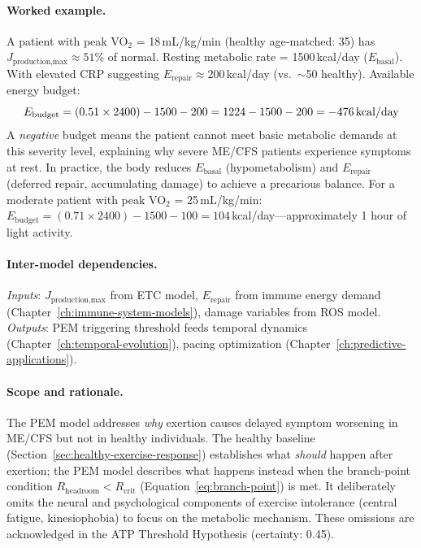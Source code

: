 \paragraph{Worked example.}
A patient with peak VO$_2$ = 18\,mL/kg/min (healthy age-matched: 35) has $J_{\text{production,max}} \approx 51\%$ of normal. Resting metabolic rate = 1500\,kcal/day ($E_{\text{basal}}$). With elevated CRP suggesting $E_{\text{repair}} \approx 200$\,kcal/day (vs.\ $\sim$50 healthy). Available energy budget:
\[
E_{\text{budget}} = (0.51 \times 2400) - 1500 - 200 = 1224 - 1500 - 200 = -476 \text{\,kcal/day}
\]
A \emph{negative} budget means the patient cannot meet basic metabolic demands at this severity level, explaining why severe ME/CFS patients experience symptoms at rest. In practice, the body reduces $E_{\text{basal}}$ (hypometabolism) and $E_{\text{repair}}$ (deferred repair, accumulating damage) to achieve a precarious balance. For a moderate patient with peak VO$_2$ = 25\,mL/kg/min: $E_{\text{budget}} = (0.71 \times 2400) - 1500 - 100 = 104$\,kcal/day---approximately 1 hour of light activity.

\paragraph{Inter-model dependencies.}
\emph{Inputs}: $J_{\text{production,max}}$ from ETC model, $E_{\text{repair}}$ from immune energy demand (Chapter~\ref{ch:immune-system-models}), damage variables from ROS model. \emph{Outputs}: PEM triggering threshold feeds temporal dynamics (Chapter~\ref{ch:temporal-evolution}), pacing optimization (Chapter~\ref{ch:predictive-applications}).

\paragraph{Scope and rationale.}
The PEM model addresses \emph{why} exertion causes delayed symptom worsening in ME/CFS but not in healthy individuals. The healthy baseline (Section~\ref{sec:healthy-exercise-response}) establishes what \emph{should} happen after exertion; the PEM model describes what happens instead when the branch-point condition $R_{\text{headroom}} < R_{\text{crit}}$ (Equation~\ref{eq:branch-point}) is met. It deliberately omits the neural and psychological components of exercise intolerance (central fatigue, kinesiophobia) to focus on the metabolic mechanism. These omissions are acknowledged in the ATP Threshold Hypothesis (certainty: 0.45).


